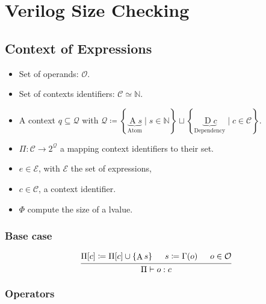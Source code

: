\documentclass{article}
\DeclareMathOperator{\D}{D}
\DeclareMathOperator{\A}{A}
\begin{document}
\section*{Verilog Size Checking}

\subsection*{Context of Expressions}

\begin{itemize}
    \item Set of operands: $\mathcal{O}$.
    \item Set of contexts identifiers: $\mathcal{C} \simeq \mathbb{N}$.
    \item A context $q \subseteq \mathcal{Q}$ with
          $\mathcal{Q} \coloneq
              \left\{\underbrace{\A s}_{\text{Atom}} \mid s \in \mathbb{N}\right\} \sqcup
              \left\{\underbrace{\D c}_{\text{Dependency}} \mid c \in \mathcal{C}\right\}$.

    \item $\Pi: \mathcal{C} \to 2^{\mathcal{Q}}$ a mapping context identifiers to their set.
    \item $e \in \mathcal{E}$, with $\mathcal{E}$ the set of expressions,
    \item $c \in \mathcal{C}$, a context identifier.
    \item $\Phi$ compute the size of a lvalue.
\end{itemize}



\subsubsection*{Base case}

\begin{equation*}
    \begin{prooftree}
        \hypo{\Pi[c] \coloneq \Pi[c] \cup \left\{\A s\right\}}
        \hypo{s \coloneq \Gamma(o)}
        \hypo{o \in \mathcal{O}}
        \infer3{\Pi\vdash o: c}
    \end{prooftree}
\end{equation*}

\subsubsection*{Operators}
\end{document}
